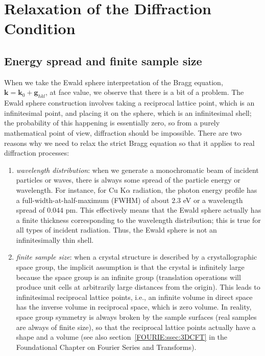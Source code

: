 \section{Relaxation of the Diffraction Condition}\label{\chabbr:sec:relaxedBragg}

\subsection{Energy spread and finite sample size}\label{\chabbr:ssec:spreadsize}
When we take the Ewald sphere interpretation of the Bragg equation, $\mathbf{k}=\mathbf{k}_0+\mathbf{g}_{hkl}$, at face value, we observe that there is a bit of a problem.  The Ewald sphere construction involves taking a reciprocal lattice point, which is an infinitesimal point, and placing it on the sphere, which is an infinitesimal shell; the probability of this happening is essentially zero, so from a purely mathematical point of view, diffraction should be impossible.  There are two reasons why we need to relax the strict Bragg equation so that it applies to real diffraction processes:
\begin{enumerate}
\item \textit{wavelength distribution}: when we generate a monochromatic beam of incident particles or waves, there is always some spread of the particle energy or wavelength.  For instance, for Cu K$\alpha$ radiation, the photon energy profile has a full-width-at-half-maximum (FWHM) of about $2.3$ eV \cite{mendenhall2017a} or a wavelength spread of $0.044$ pm. This effectively means that the Ewald sphere actually has a finite thickness corresponding to the wavelength distribution; this is true for all types of incident radiation.  Thus, the Ewald sphere is not an infinitesimally thin shell.
\item \textit{finite sample size}: when a crystal structure is described by a crystallographic space group, the implicit assumption is that the crystal is infinitely large because the space group is an infinite group (translation operations will produce unit cells at arbitrarily large distances from the origin). This leads to infinitesimal reciprocal lattice points, i.e., an infinite volume in direct space has the inverse volume in reciprocal space, which is zero volume.  In reality, space group symmetry is always broken by the sample surfaces (real samples are always of finite size), so that the reciprocal lattice points actually have a shape and a volume (see also section~\ref{FOURIE:ssec:3DCFT} in the Foundational Chapter on Fourier Series and Transforms).
\end{enumerate}
